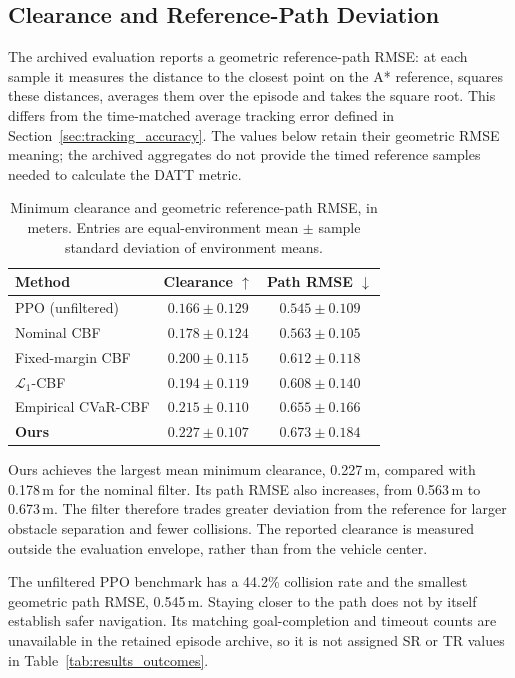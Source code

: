 \clearpage
\subsection{Clearance and Reference-Path Deviation}

The archived evaluation reports a geometric reference-path RMSE: at each sample it measures the distance to the closest point on the A* reference, squares these distances, averages them over the episode and takes the square root. This differs from the time-matched average tracking error defined in Section~\ref{sec:tracking_accuracy}. The values below retain their geometric RMSE meaning; the archived aggregates do not provide the timed reference samples needed to calculate the DATT metric.

\begin{table}[H]
\centering
\caption{Minimum clearance and geometric reference-path RMSE, in meters. Entries are equal-environment mean $\pm$ sample standard deviation of environment means.}
\label{tab:results_geometry}
{\small\renewcommand{\arraystretch}{1.4}
\begin{tabularx}{\linewidth}{@{}Ycc@{}}
\toprule
\textbf{Method} & \textbf{Clearance $\uparrow$} & \textbf{Path RMSE $\downarrow$}\\
\midrule
PPO (unfiltered) & $0.166\pm0.129$ & $0.545\pm0.109$ \\
Nominal CBF & $0.178\pm0.124$ & $0.563\pm0.105$ \\
Fixed-margin CBF & $0.200\pm0.115$ & $0.612\pm0.118$ \\
$\mathcal L_1$-CBF & $0.194\pm0.119$ & $0.608\pm0.140$ \\
Empirical CVaR-CBF & $0.215\pm0.110$ & $0.655\pm0.166$ \\
\textbf{Ours} & $0.227\pm0.107$ & $0.673\pm0.184$ \\
\bottomrule
\end{tabularx}}
\end{table}

Ours achieves the largest mean minimum clearance, 0.227\,m, compared with 0.178\,m for the nominal filter. Its path RMSE also increases, from 0.563\,m to 0.673\,m. The filter therefore trades greater deviation from the reference for larger obstacle separation and fewer collisions. The reported clearance is measured outside the evaluation envelope, rather than from the vehicle center.

The unfiltered PPO benchmark has a 44.2\% collision rate and the smallest geometric path RMSE, 0.545\,m. Staying closer to the path does not by itself establish safer navigation. Its matching goal-completion and timeout counts are unavailable in the retained episode archive, so it is not assigned SR or TR values in Table~\ref{tab:results_outcomes}.

